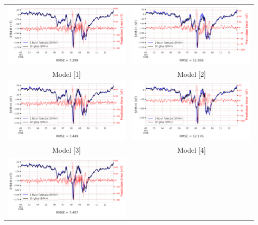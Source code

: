 \documentclass[draft,sw]{agutexSI2019}
\begin{document}
\begin{table}
\centering
\begin{tabular}{cc}
\includegraphics[width=0.49\linewidth]{paper_plots/1h_swics/1h_swics_storm_27.png}
&
\includegraphics[width=0.49\linewidth]{paper_plots/2h_swics/2h_swics_storm_27.png}
\\
Model [1] & Model [2]
\vspace*{12pt}
\\
\includegraphics[width=0.49\linewidth]{paper_plots/1h_no_swics/1h_no_swics_storm_27.png}
&
\includegraphics[width=0.49\linewidth]{paper_plots/2h_no_swics/2h_no_swics_storm_27.png}
\\
Model [3] & Model [4]
\vspace*{12pt}
\\
\includegraphics[width=0.49\linewidth]{paper_plots/1h_swics_model_on_no_swics/1h_swics_model_on_no_swics_storm_27.png}

\end{tabular}
\end{table}
\end{document}

